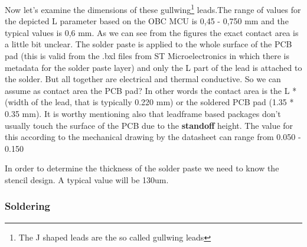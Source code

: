 \documentclass[final]{cubedoc}
\begin{document}
	
	
	
	
	Now let's examine the dimensions of these gullwing\footnote{The J shaped leads are the so called gullwing leads} leads.The range of values for the depicted L parameter based on the OBC MCU is 0,45 - 0,750 mm and the typical values is 0,6 mm. As we can see from the figures the exact contact area is a little bit unclear. The solder paste is applied to the whole surface of the PCB pad (this is valid from the .bxl files from ST Microelectronics in which there is metadata for the solder paste layer) and only the L part of the lead is attached to the solder. But all together are electrical and thermal conductive. So we can assume as contact area the PCB pad? In other words the contact area is the L * (width of the lead, that is typically 0.220 mm) or the soldered PCB pad (1.35 * 0.35 mm). It is worthy mentioning also that leadframe based packages don't usually touch the surface of the PCB due to the \textbf{standoff} height. The value for this according to the mechanical drawing by the datasheet can range from 0.050 - 0.150
	
	In order to determine the thickness of the solder paste we need to know the stencil design. A typical value will be 130um.
	\newline
	
	
	\subsubsection{Soldering}
	
	
\end{document}
